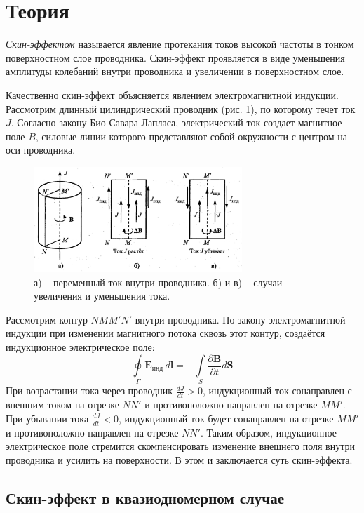 \section*{Теория}

\textit{Скин-эффектом} называется явление протекания токов высокой частоты в тонком поверхностном слое проводника. Скин-эффект проявляется в виде уменьшения амплитуды колебаний внутри проводника и увеличении в поверхностном слое.

Качественно скин-эффект объясняется явлением электромагнитной индукции. Рассмотрим длинный цилиндрический проводник (рис. \ref{fig:emi}), по которому течет ток $J$. Согласно закону Био-Савара-Лапласа, электрический ток создает магнитное поле $B$, силовые линии которого представляют собой окружности с центром на оси проводника.

\begin{figure}[H]
	\centering
	\includegraphics[width=0.7\textwidth]{../res/emi.png}
	\caption{а) -- переменный ток внутри проводника. б) и в) -- случаи увеличения и уменьшения тока.}
	\label{fig:emi}
\end{figure}

Рассмотрим контур $NMM'N'$ внутри проводника. По закону электромагнитной индукции при изменении магнитного потока сквозь этот контур, создаётся индукционное электрическое поле:
$$
	\oint\limits_\Gamma \pmb{E}_{инд} \,d\pmb{l} = - \int\limits_S \frac{\partial \pmb{B}}{\partial t} d\pmb{S}
$$
При возрастании тока через проводник $\frac{d J}{dt} > 0$, индукционный ток сонаправлен с внешним током на отрезке $NN'$ и противоположно направлен на отрезке $MM'$. При убывании тока $\frac{d J}{dt} < 0$, индукционный ток будет сонаправлен на отрезке $MM'$ и противоположно направлен на отрезке $NN'$. Таким образом, индукционное электрическое поле стремится скомпенсировать изменение внешнего поля внутри проводника и усилить на поверхности. В этом и заключается суть скин-эффекта.

\subsection*{Скин-эффект в квазиодномерном случае}

